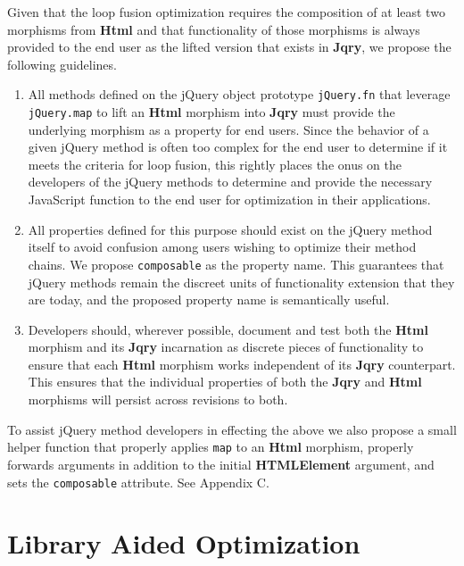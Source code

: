 \documentclass[preprint]{sigplanconf}
\begin{document}
Given that the loop fusion optimization requires the composition of at least two morphisms from \textbf{Html} and that functionality of those morphisms is always provided to the end user as the lifted version that exists in \textbf{Jqry}, we propose the following guidelines.

\begin{enumerate}
  \item \label{item:standard-1} All methods defined on the jQuery object prototype \verb|jQuery.fn| that leverage \verb|jQuery.map| to lift an \textbf{Html} morphism into \textbf{Jqry} must provide the underlying morphism as a property for end users. Since the behavior of a given jQuery method is often too complex for the end user to determine if it meets the criteria for loop fusion, this rightly places the onus on the developers of the jQuery methods to determine and provide the necessary JavaScript function to the end user for optimization in their applications.
  \item \label{item:standard-2} All properties defined for this purpose should exist on the jQuery method itself to avoid confusion among users wishing to optimize their method chains. We propose \verb|composable| as the property name. This guarantees that jQuery methods remain the discreet units of functionality extension that they are today, and the proposed property name is semantically useful.
  \item \label{item:standard-3}Developers should, wherever possible, document and test both the \textbf{Html} morphism and its \textbf{Jqry} incarnation as discrete pieces of functionality to ensure that each \textbf{Html} morphism works independent of its \textbf{Jqry} counterpart. This ensures that the individual properties of both the \textbf{Jqry} and \textbf{Html} morphisms will persist across revisions to both.
\end{enumerate}

To assist jQuery method developers in effecting the above we also propose a small helper function that properly applies \verb|map| to an \textbf{Html} morphism, properly forwards arguments in addition to the initial \textbf{HTMLElement} argument, and sets the \verb|composable| attribute. See Appendix C.

\section{Library Aided Optimization} \label{sec:library-aided-optimization}
\end{document}

